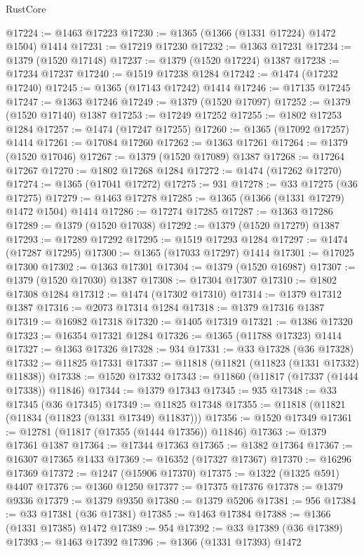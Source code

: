 \begin{lexlean}{RustCore}
\begin{coremodule}
@17224 := @1463 @17223
@17230 := @1365 (@1366 (@1331 @17224) @1472 @1504) @1414
@17231 := @17219 @17230
@17232 := @1363 @17231
@17234 := @1379 (@1520 @17148)
@17237 := @1379 (@1520 @17224) @1387
@17238 := @17234 @17237
@17240 := @1519 @17238 @1284
@17242 := @1474 (@17232 @17240)
@17245 := @1365 (@17143 @17242) @1414
@17246 := @17135 @17245
@17247 := @1363 @17246
@17249 := @1379 (@1520 @17097)
@17252 := @1379 (@1520 @17140) @1387
@17253 := @17249 @17252
@17255 := @1802 @17253 @1284
@17257 := @1474 (@17247 @17255)
@17260 := @1365 (@17092 @17257) @1414
@17261 := @17084 @17260
@17262 := @1363 @17261
@17264 := @1379 (@1520 @17046)
@17267 := @1379 (@1520 @17089) @1387
@17268 := @17264 @17267
@17270 := @1802 @17268 @1284
@17272 := @1474 (@17262 @17270)
@17274 := @1365 (@17041 @17272)
@17275 := 931
@17278 := @33 @17275 (@36 @17275)
@17279 := @1463 @17278
@17285 := @1365 (@1366 (@1331 @17279) @1472 @1504) @1414
@17286 := @17274 @17285
@17287 := @1363 @17286
@17289 := @1379 (@1520 @17038)
@17292 := @1379 (@1520 @17279) @1387
@17293 := @17289 @17292
@17295 := @1519 @17293 @1284
@17297 := @1474 (@17287 @17295)
@17300 := @1365 (@17033 @17297) @1414
@17301 := @17025 @17300
@17302 := @1363 @17301
@17304 := @1379 (@1520 @16987)
@17307 := @1379 (@1520 @17030) @1387
@17308 := @17304 @17307
@17310 := @1802 @17308 @1284
@17312 := @1474 (@17302 @17310)
@17314 := @1379 @17312 @1387
@17316 := @2073 @17314 @1284
@17318 := @1379 @17316 @1387
@17319 := @16982 @17318
@17320 := @1405 @17319
@17321 := @1386 @17320
@17323 := @16354 @17321 @1284
@17326 := @1365 (@11788 @17323) @1414
@17327 := @1363 @17326
@17328 := 934
@17331 := @33 @17328 (@36 @17328)
@17332 := @11825 @17331
@17337 := @11818 (@11821 (@11823 (@1331 @17332) @11838))
@17338 := @1520 @17332
@17343 := @11860 (@11817 (@17337 (@1444 @17338)) @11846)
@17344 := @1379 @17343
@17345 := 935
@17348 := @33 @17345 (@36 @17345)
@17349 := @11825 @17348
@17355 := @11818 (@11821 (@11834 (@11823 (@1331 @17349) @11837)))
@17356 := @1520 @17349
@17361 := @12781 (@11817 (@17355 (@1444 @17356)) @11846)
@17363 := @1379 @17361 @1387
@17364 := @17344 @17363
@17365 := @1382 @17364
@17367 := @16307 @17365 @1433
@17369 := @16352 (@17327 @17367)
@17370 := @16296 @17369
@17372 := @1247 (@15906 @17370)
@17375 := @1322 (@1325 @591) @4407
@17376 := @1360 @1250
@17377 := @17375 @17376
@17378 := @1379 @9336
@17379 := @1379 @9350
@17380 := @1379 @5206
@17381 := 956
@17384 := @33 @17381 (@36 @17381)
@17385 := @1463 @17384
@17388 := @1366 (@1331 @17385) @1472
@17389 := 954
@17392 := @33 @17389 (@36 @17389)
@17393 := @1463 @17392
@17396 := @1366 (@1331 @17393) @1472

\end{coremodule}
\end{lexlean}
